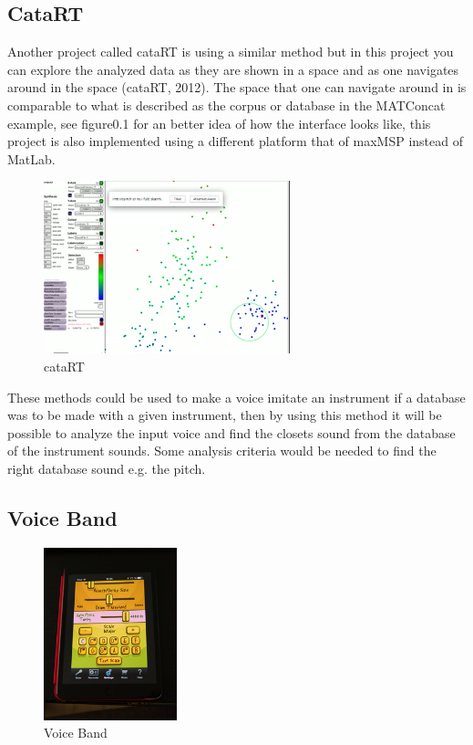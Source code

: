 \subsection{ CataRT }
Another project called cataRT is using a similar method but in this project you can explore the analyzed data as they are shown in a space and as one navigates around in the space (cataRT, 2012). The space that one can navigate around in is comparable to what is described as the corpus or database in the MATConcat example, see figure0.1 for an better idea of how the interface looks like, this project is also implemented using a different platform that of maxMSP instead of MatLab.\\
\begin{figure}[h]
	\begin{center}
		\includegraphics[height=5cm]{fig/cataRT.png}
		\caption{cataRT}
		\label{cataRT picture form video of cataRT showing the interface.}
	\end{center}
\end{figure} 
These methods could be used to make a voice imitate an instrument if a database was to be made with a given instrument, then by using this method it will be possible to analyze the input voice and find the closets sound from the database of the instrument sounds. Some analysis criteria would be needed to find the right database sound e.g. the pitch. 

\subsection{ Voice Band }
\begin{figure}[h]
	\begin{center}
		\includegraphics[height=5cm]{fig/voiceband.png}
		\caption{Voice Band}
		\label{VoiceBand}
	\end{center}
\end{figure}

